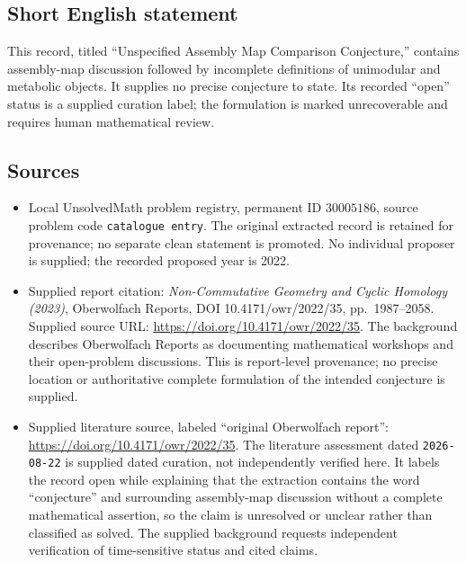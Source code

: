 \documentclass[11pt]{article}
\begin{document}
\subsection{Short English statement}
This record, titled ``Unspecified Assembly Map Comparison Conjecture,'' contains assembly-map discussion followed by incomplete definitions of unimodular and metabolic objects. It supplies no precise conjecture to state. Its recorded ``open'' status is a supplied curation label; the formulation is marked unrecoverable and requires human mathematical review.
\subsection{Sources}
\begin{itemize}
\item Local UnsolvedMath problem registry, permanent ID \(30005186\), source problem code \texttt{catalogue entry}. The original extracted record is retained for provenance; no separate clean statement is promoted. No individual proposer is supplied; the recorded proposed year is 2022.
\item Supplied report citation: \emph{Non-Commutative Geometry and Cyclic Homology (2023)}, Oberwolfach Reports, DOI 10.4171/owr/2022/35, pp.\ 1987--2058. Supplied source URL: \url{https://doi.org/10.4171/owr/2022/35}. The background describes Oberwolfach Reports as documenting mathematical workshops and their open-problem discussions. This is report-level provenance; no precise location or authoritative complete formulation of the intended conjecture is supplied.
\item Supplied literature source, labeled ``original Oberwolfach report'': \url{https://doi.org/10.4171/owr/2022/35}. The literature assessment dated \texttt{2026-08-22} is supplied dated curation, not independently verified here. It labels the record open while explaining that the extraction contains the word ``conjecture'' and surrounding assembly-map discussion without a complete mathematical assertion, so the claim is unresolved or unclear rather than classified as solved. The supplied background requests independent verification of time-sensitive status and cited claims.
\end{itemize}
\end{document}
